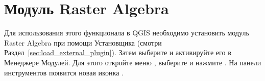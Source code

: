 
\section{Модуль Raster Algebra}\label{sec:ftools}



Для использования этого функционала в QGIS необходимо установить модуль
Raster Algebra при помощи  Установщика
(смотри Раздел~\ref{sec:load_external_plugin}). Затем выберите и активируйте
его в Менеджере Модулей. Для этого откройте меню  \arrow
{}, выберите  и
нажмите . На панели инструментов появится новая иконка
.

